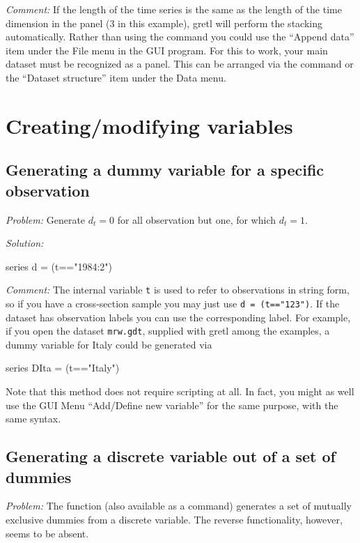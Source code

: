 \emph{Comment:} If the length of the time series is the same as the
length of the time dimension in the panel (3 in this example), gretl
will perform the stacking automatically.  Rather than using the
 command you could use the ``Append data'' item under
the \textsf{File} menu in the GUI program.  For this to work, your
main dataset must be recognized as a panel.  This can be arranged via
the  command or the ``Dataset structure'' item under
the \textsf{Data} menu.


\section{Creating/modifying variables}

\subsection{Generating a dummy variable for a specific observation}

\emph{Problem:} Generate $d_t = 0$ for all observation but one, for
which $d_t = 1$.

\emph{Solution:}
\begin{code}
  series d = (t=="1984:2")
\end{code}

\emph{Comment:} The internal variable \texttt{t} is used to refer to
observations in string form, so if you have a cross-section sample you
may just use \texttt{d = (t=="123")}. If the dataset has observation
labels you can use the corresponding label. For example, if you open the
dataset \texttt{mrw.gdt}, supplied with gretl among the
examples, a dummy variable for Italy could be generated via
\begin{code}
  series DIta = (t=="Italy")
\end{code}

Note that this method does not require scripting at all. In fact, you
might as well use the GUI Menu ``Add/Define new variable'' for the
same purpose, with the same syntax.

\subsection{Generating a discrete variable out of a set of dummies}

\emph{Problem:} The  function (also available as a
command) generates a set of mutually exclusive dummies from a discrete
variable. The reverse functionality, however, seems to be absent.


